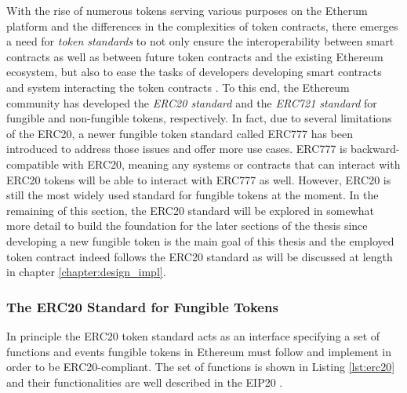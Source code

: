 
With the rise of numerous tokens serving various purposes on the Etherum platform and the differences in the complexities of token contracts, there emerges a need for \textit{token standards} to not only ensure the interoperability between smart contracts as well as between future token contracts and the existing Ethereum ecosystem, but also to ease the tasks of developers developing smart contracts and system interacting the token contracts \cite{jdourlens, eth_tokenstd}. To this end, the Ethereum community has developed the \textit{ERC20 standard} and the \textit{ERC721 standard} for fungible and non-fungible tokens, respectively. In fact, due to several limitations of the ERC20, a newer fungible token standard called ERC777 has been introduced to address those issues and offer more use cases. ERC777 is backward-compatible with ERC20, meaning any systems or contracts that can interact with ERC20 tokens will be able to interact with ERC777 as well. However, ERC20 is still the most widely used standard for fungible tokens at the moment. 
In the remaining of this section, the ERC20 standard will be explored in somewhat more detail to build the foundation for the later sections of the thesis since developing a new fungible token is the main goal of this thesis and the employed token contract indeed follows the ERC20 standard as will be discussed at length in chapter \ref{chapter:design_impl}.

\subsubsection{The ERC20 Standard for Fungible Tokens}

In principle the ERC20 token standard acts as an interface specifying a set of functions and events fungible tokens in Ethereum must follow and implement in order to be ERC20-compliant. The set of functions is shown in Listing \ref{lst:erc20} and their functionalities are well described in the EIP20 \cite{eip20}.

